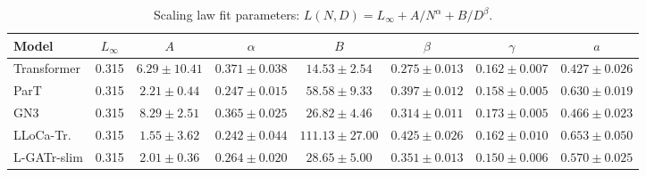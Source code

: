 \begin{table}[ht]
\centering
\caption{Scaling law fit parameters: $L(N,D) = L_\infty + A/N^\alpha + B/D^\beta$.}
\label{tab:scaling_law_fits}
\begin{tabular}{l c c c c c c c}
\toprule
Model & $L_\infty$ & $A$ & $\alpha$ & $B$ & $\beta$ & $\gamma$ & $a$ \\
\midrule
Transformer & 0.315 & $6.29 \pm 10.41$ & $0.371 \pm 0.038$ & $14.53 \pm 2.54$ & $0.275 \pm 0.013$ & $0.162 \pm 0.007$ & $0.427 \pm 0.026$ \\
ParT & 0.315 & $2.21 \pm 0.44$ & $0.247 \pm 0.015$ & $58.58 \pm 9.33$ & $0.397 \pm 0.012$ & $0.158 \pm 0.005$ & $0.630 \pm 0.019$ \\
GN3 & 0.315 & $8.29 \pm 2.51$ & $0.365 \pm 0.025$ & $26.82 \pm 4.46$ & $0.314 \pm 0.011$ & $0.173 \pm 0.005$ & $0.466 \pm 0.023$ \\
LLoCa-Tr. & 0.315 & $1.55 \pm 3.62$ & $0.242 \pm 0.044$ & $111.13 \pm 27.00$ & $0.425 \pm 0.026$ & $0.162 \pm 0.010$ & $0.653 \pm 0.050$ \\
L-GATr-slim & 0.315 & $2.01 \pm 0.36$ & $0.264 \pm 0.020$ & $28.65 \pm 5.00$ & $0.351 \pm 0.013$ & $0.150 \pm 0.006$ & $0.570 \pm 0.025$ \\
\bottomrule
\end{tabular}
\end{table}
